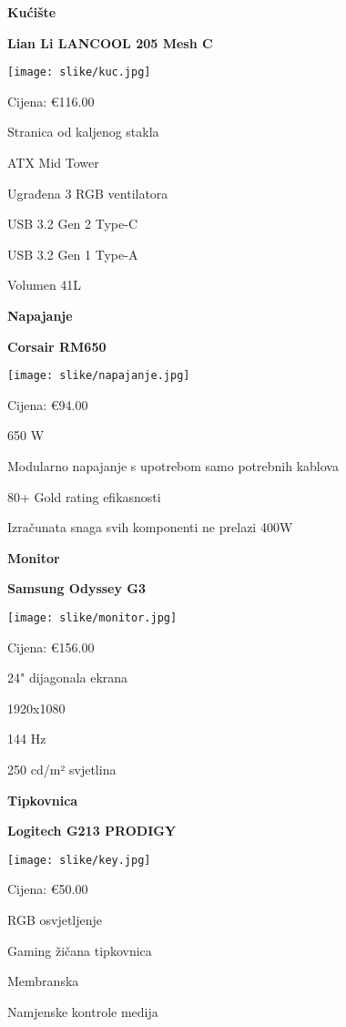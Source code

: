 \documentclass{article}
\begin{document}
\newpage



\large\textbf{Kućište}

\textbf{Lian Li LANCOOL 205 Mesh C}\par

   \texttt{[image: slike/kuc.jpg]}\par
Cijena: €116.00\par
Stranica od kaljenog stakla\par
ATX Mid Tower\par
Ugrađena 3 RGB ventilatora\par
USB 3.2 Gen 2 Type-C\par
USB 3.2 Gen 1 Type-A\par
Volumen 41L\par



\newpage


\large\textbf{Napajanje}

\textbf{Corsair RM650}\par
   \texttt{[image: slike/napajanje.jpg]}\par
Cijena: €94.00\par
650 W\par
Modularno napajanje s upotrebom samo potrebnih kablova\par
80+ Gold rating efikasnosti\par
Izračunata snaga svih komponenti ne prelazi 400W\par


\newpage


\large\textbf{Monitor}

\textbf{Samsung Odyssey G3}\par
   \texttt{[image: slike/monitor.jpg]}\par
Cijena: €156.00\par
24" dijagonala ekrana\par
1920x1080 \par
144 Hz\par
250 cd/m² svjetlina


\newpage


\large\textbf{Tipkovnica}

\textbf{Logitech G213 PRODIGY}\par
   \texttt{[image: slike/key.jpg]}\par
Cijena: €50.00\par
RGB osvjetljenje\par
Gaming žičana tipkovnica\par
Membranska\par
Namjenske kontrole medija\par
\end{document}
